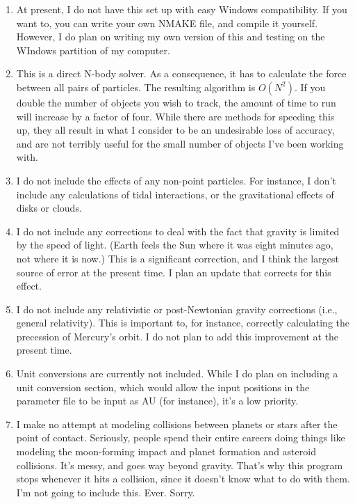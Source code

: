 \documentclass{article}
\begin{document}
\begin{enumerate}
	\item At present, I do not have this set up with easy Windows compatibility.  If you want to, you can write your own NMAKE file, and compile it yourself.  However, I do plan on writing my own version of this and testing on the WIndows partition of my computer.
	\item This is a direct N-body solver.  As a consequence, it has to calculate the force between all pairs of particles.  The resulting algorithm is $O(N^2)$.  If you double the number of objects you wish to track, the amount of time to run will increase by a factor of four.  While there are methods for speeding this up, they all result in what I consider to be an undesirable loss of accuracy, and are not terribly useful for the small number of objects I've been working with.
	\item I do not include the effects of any non-point particles.  For instance, I don't include any calculations of tidal interactions, or the gravitational effects of disks or clouds.
	\item I do not include any corrections to deal with the fact that gravity is limited by the speed of light.  (Earth feels the Sun where it was eight minutes ago, not where it is now.)  This is a significant correction, and I think the largest source of error at the present time.  I plan an update that corrects for this effect.
	\item I do not include any relativistic or post-Newtonian gravity corrections (i.e., general relativity).  This is important to, for instance, correctly calculating the precession of Mercury's orbit.  I do not plan to add this improvement at the present time.
	\item Unit conversions are currently not included.  While I do plan on including a unit conversion section, which would allow the input positions in the parameter file to be input as AU (for instance), it's a low priority.
	\item I make no attempt at modeling collisions between planets or stars after the point of contact.  Seriously, people spend their entire careers doing things like modeling the moon-forming impact and planet formation and asteroid collisions.  It's messy, and goes way beyond gravity.  That's why this program stops whenever it hits a collision, since it doesn't know what to do with them.  I'm not going to include this.  Ever.  Sorry.  
\end{enumerate}
\end{document}
